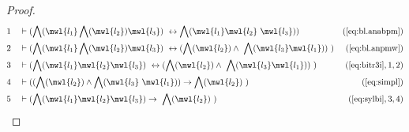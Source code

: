 \begin{proof}
\begin{align}
  1 &&  & \vdash ( \bigwedge( \mwl{l_1} \bigwedge( \mwl{l_2} ) \mwl{l_3} )
     ~\leftrightarrow \bigwedge( \mwl{l_1} \mwl{l_2}
     ~\mwl{l_3} ) )&(\mbox{\ref{eq:bl.anabpm}})\notag
  \\ 2 &&  & \vdash ( \bigwedge( \mwl{l_1} \bigwedge( \mwl{l_2} ) \mwl{l_3} )
     ~\leftrightarrow ( \bigwedge( \mwl{l_2} ) \wedge
     ~\bigwedge( \mwl{l_3} \mwl{l_1} ) )
     ~)&(\mbox{\ref{eq:bl.anpmw}})\notag
  \\ 3 &&  & \vdash ( \bigwedge( \mwl{l_1} \mwl{l_2} \mwl{l_3} )
     ~\leftrightarrow ( \bigwedge( \mwl{l_2} ) \wedge
     ~\bigwedge( \mwl{l_3} \mwl{l_1} ) )
     ~)&(\mbox{\ref{eq:bitr3i}},1,2)\notag
  \\ 4 &&  & \vdash ( ( \bigwedge( \mwl{l_2} ) \wedge \bigwedge( \mwl{l_3}
     ~\mwl{l_1} ) ) \rightarrow \bigwedge( \mwl{l_2} )
     ~)&(\mbox{\ref{eq:simpl}})\notag
  \\ 5 &&  & \vdash ( \bigwedge( \mwl{l_1} \mwl{l_2} \mwl{l_3} ) \rightarrow
     ~\bigwedge( \mwl{l_2} )
     ~)&(\mbox{\ref{eq:sylbi}},3,4)\notag
\end{align}
\end{proof}

